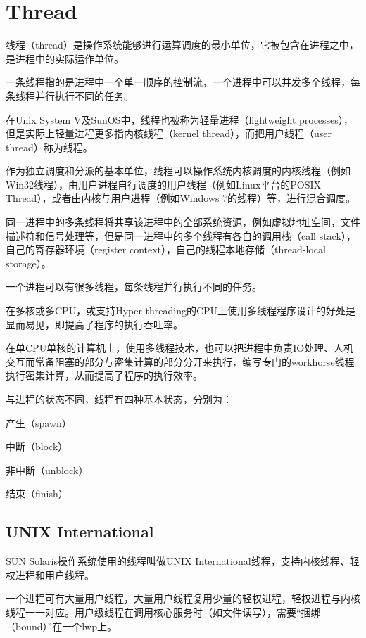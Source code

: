 \section{Thread}

线程（thread）是操作系统能够进行运算调度的最小单位，它被包含在进程之中，是进程中的实际运作单位。

一条线程指的是进程中一个单一顺序的控制流，一个进程中可以并发多个线程，每条线程并行执行不同的任务。

在Unix System V及SunOS中，线程也被称为轻量进程（lightweight processes），但是实际上轻量进程更多指内核线程（kernel thread），而把用户线程（user thread）称为线程。

作为独立调度和分派的基本单位，线程可以操作系统内核调度的内核线程（例如Win32线程），由用户进程自行调度的用户线程（例如Linux平台的POSIX Thread），或者由内核与用户进程（例如Windows 7的线程）等，进行混合调度。

同一进程中的多条线程将共享该进程中的全部系统资源，例如虚拟地址空间，文件描述符和信号处理等，但是同一进程中的多个线程有各自的调用栈（call stack），自己的寄存器环境（register context），自己的线程本地存储（thread-local storage）。



一个进程可以有很多线程，每条线程并行执行不同的任务。

在多核或多CPU，或支持Hyper-threading的CPU上使用多线程程序设计的好处是显而易见，即提高了程序的执行吞吐率。

在单CPU单核的计算机上，使用多线程技术，也可以把进程中负责IO处理、人机交互而常备阻塞的部分与密集计算的部分分开来执行，编写专门的workhorse线程执行密集计算，从而提高了程序的执行效率。

与进程的状态不同，线程有四种基本状态，分别为：

\begin{compactitem}
\item 产生（spawn）
\item 中断（block）
\item 非中断（unblock）
\item 结束（finish）
\end{compactitem}

\subsection{UNIX  International}

SUN Solaris操作系统使用的线程叫做UNIX International线程，支持内核线程、轻权进程和用户线程。

一个进程可有大量用户线程，大量用户线程复用少量的轻权进程，轻权进程与内核线程一一对应。用户级线程在调用核心服务时（如文件读写），需要“捆绑（bound）”在一个lwp上。

